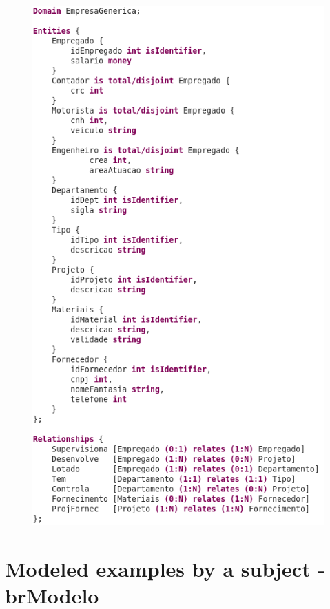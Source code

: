 \begin{figure}[!htb]
    \centering
    \includegraphics[scale=0.5]{postextuais/appendix/Instrument2-ReferenceModel-ERtext.png}
    \label{fig:referenceModelERtextInst2}
\end{figure}

\newpage

\section{Modeled examples by a subject - brModelo}

